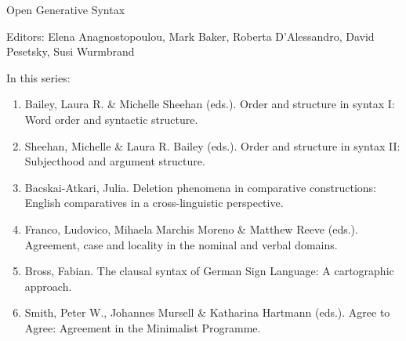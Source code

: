 {\large Open Generative Syntax}

\bigskip

Editors:   Elena Anagnostopoulou,
    Mark Baker,
    Roberta D’Alessandro,
    David Pesetsky,
    Susi Wurmbrand


\bigskip

In this series:

\begin{enumerate}
\item Bailey, Laura R. \& Michelle Sheehan (eds.). Order and structure in syntax I: Word order and syntactic structure.
\item Sheehan, Michelle \& Laura R. Bailey (eds.).  Order and structure in syntax II: Subjecthood and argument structure.
\item Bacskai-Atkari, Julia. Deletion phenomena in comparative constructions: English comparatives in a cross-linguistic perspective.
\item Franco, Ludovico, Mihaela Marchis Moreno \& Matthew Reeve (eds.). Agreement, case and locality in the nominal and verbal domains.
\item Bross, Fabian. The clausal syntax of German Sign Language: A cartographic approach.
\item Smith, Peter W., Johannes Mursell \& Katharina Hartmann (eds.). Agree to Agree: Agreement in the Minimalist Programme.
\end{enumerate}



\vfill

